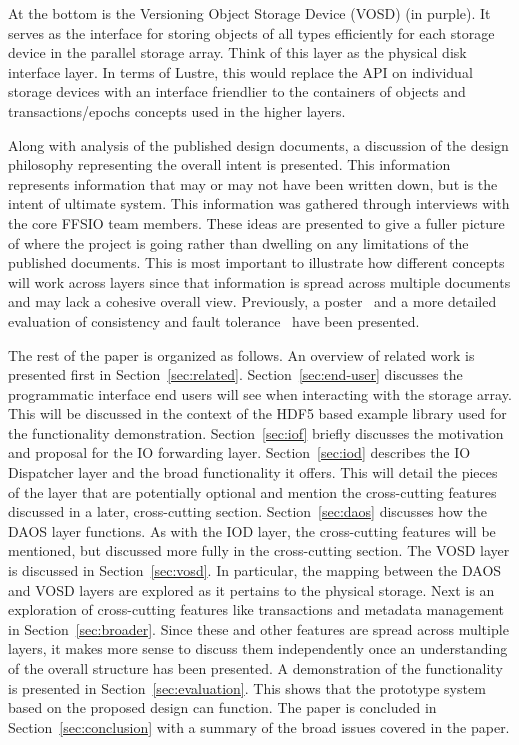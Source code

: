 \documentclass[conference]{IEEEtran} \pdfpagewidth=8.5in
\begin{document}
At the bottom is the Versioning Object Storage Device (VOSD) (in purple).  It
serves as the interface for storing objects of all types efficiently for each
storage device in the parallel storage array. Think of this layer as the
physical disk interface layer. In terms of Lustre, this would replace the API
on individual storage devices with an interface friendlier to the containers of
objects and transactions/epochs concepts used in the higher layers.

Along with analysis of the published design documents, a discussion of the
design philosophy representing the overall intent is presented. This
information represents information that may or may not have been written down,
but is the intent of ultimate system.  This information was gathered through
interviews with the core FFSIO team members. These ideas are presented to give
a fuller picture of where the project is going rather than dwelling on any
limitations of the published documents. This is most important to illustrate
how different concepts will work across layers since that information is spread
across multiple documents and may lack a cohesive overall view. Previously,
a poster~\cite{lofstead:2014:ffsio-poster} and a more detailed evaluation of
consistency and fault tolerance~\cite{lofstead:2014:ffsio-consistency} have
been presented.

The rest of the paper is organized as follows. An overview of related work is
presented first in Section~\ref{sec:related}. Section~\ref{sec:end-user}
discusses the programmatic interface end users will see when interacting with
the storage array. This will be discussed in the context of the HDF5 based
example library used for the functionality demonstration. Section~\ref{sec:iof}
briefly discusses the motivation and proposal for the IO forwarding layer.
Section~\ref{sec:iod} describes the IO Dispatcher layer and the broad
functionality it offers. This will detail the pieces of the layer that are
potentially optional and mention the cross-cutting features discussed in a
later, cross-cutting section. Section~\ref{sec:daos} discusses how the DAOS
layer functions. As with the IOD layer, the cross-cutting features will be
mentioned, but discussed more fully in the cross-cutting section. The VOSD
layer is discussed in Section~\ref{sec:vosd}. In particular, the mapping
between the DAOS and VOSD layers are explored as it pertains to the physical
storage. Next is an exploration of cross-cutting features like transactions and
metadata management in Section~\ref{sec:broader}. Since these and other
features are spread across multiple layers, it makes more sense to discuss them
independently once an understanding of the overall structure has been
presented.  A demonstration of the functionality is presented in
Section~\ref{sec:evaluation}. This shows that the prototype system based on the
proposed design can function. The paper is concluded in
Section~\ref{sec:conclusion} with a summary of the broad issues covered in the
paper.
\end{document}
